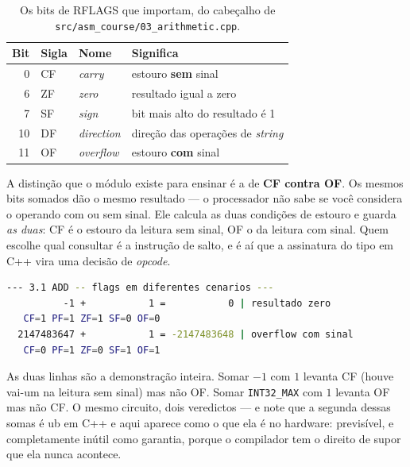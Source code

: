 \begin{table}[htbp]
\centering
\caption{Os bits de RFLAGS que importam, do cabeçalho de
         \texttt{src/asm\_course/03\_arithmetic.cpp}.}
\label{tab:rflags}
\footnotesize
\begin{tabular}{@{}rlll@{}}
\toprule
\textbf{Bit} & \textbf{Sigla} & \textbf{Nome} & \textbf{Significa} \\
\midrule
0  & CF & \emph{carry}     & estouro \textbf{sem} sinal \\
6  & ZF & \emph{zero}      & resultado igual a zero \\
7  & SF & \emph{sign}      & bit mais alto do resultado é 1 \\
10 & DF & \emph{direction} & direção das operações de \emph{string} \\
11 & OF & \emph{overflow}  & estouro \textbf{com} sinal \\
\bottomrule
\end{tabular}
\end{table}

A distinção que o módulo existe para ensinar é a de \textbf{CF contra OF}. Os
mesmos bits somados dão o mesmo resultado --- o processador não sabe se você
considera o operando com ou sem sinal. Ele calcula as duas condições de estouro
e guarda \emph{as duas}: CF é o estouro da leitura sem sinal, OF o da leitura
com sinal. Quem escolhe qual consultar é a instrução de salto, e é aí que a
assinatura do tipo em C++ vira uma decisão de \emph{opcode}.

\begin{lstlisting}[style=bt, language=bash,
    caption={Saída medida de \texttt{dist/bin/asm\_03\_arithmetic}: cada
             operação é seguida pelas \emph{flags} capturadas dentro do mesmo
             bloco \texttt{asm}.}]
--- 3.1 ADD -- flags em diferentes cenarios ---
          -1 +           1 =           0 | resultado zero
   CF=1 PF=1 ZF=1 SF=0 OF=0
  2147483647 +           1 = -2147483648 | overflow com sinal
   CF=0 PF=1 ZF=0 SF=1 OF=1
\end{lstlisting}

As duas linhas são a demonstração inteira. Somar $-1$ com $1$ levanta CF (houve
vai-um na leitura sem sinal) mas não OF. Somar \texttt{INT32\_MAX} com $1$
levanta OF mas não CF. O mesmo circuito, dois veredictos --- e note que a
segunda dessas somas é \gls{ub} em C++ e aqui aparece como o que ela é no
hardware: previsível, e completamente inútil como garantia, porque o
compilador tem o direito de supor que ela nunca acontece.

